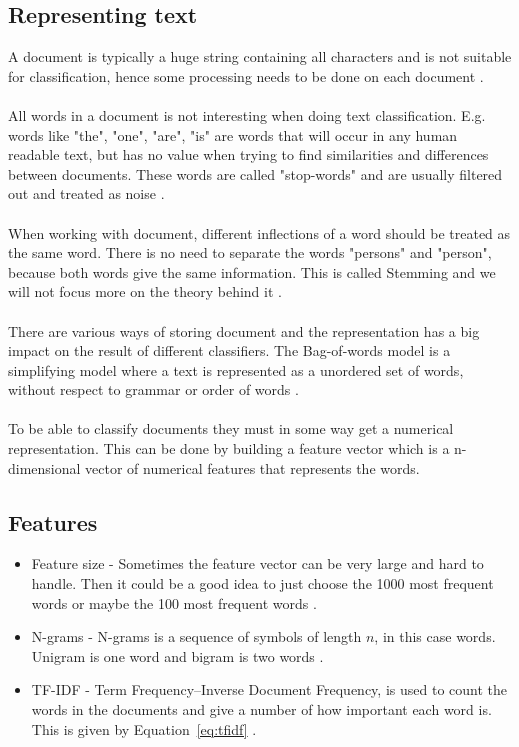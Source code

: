 \subsection{Representing text}
A document is typically a huge string containing all characters and is not
suitable for classification, hence some processing needs to be done on each
document \cite{ngrams_ai}.
\\\\
All words in a document is not interesting when doing text classification. E.g.
words like "the", "one", "are", "is" are words that will occur in any human
readable text, but has no value when trying to find similarities and
differences between documents. These words are called "stop-words" and are
usually filtered out and treated as noise \cite{joachims}.
\\\\
When working with document, different inflections of a word should be treated
as the same word. There is no need to separate the words "persons" and
"person", because both words give the same information. This is called Stemming
and we will not focus more on the theory behind it \cite{stemming}.
\\\\
There are various ways of storing document and the representation has a big
impact on the result of different classifiers. The Bag-of-words model is a
simplifying model where a text is represented as a unordered set of words,
without respect to grammar or order of words \citep{bag_of_words}.
\\\\
To be able to classify documents they must in some way get a numerical representation. 
This can be done by building a feature vector which is a n-dimensional vector of numerical 
features that represents the words.
\subsection{Features}
\begin{itemize}
\item Feature size - Sometimes the feature vector can be very large and hard to
        handle. Then it could be a good idea to just choose the 1000 most
        frequent words or maybe the 100 most frequent words \citep{joachims}.
\item N-grams - N-grams is a sequence of symbols of length $n$, in this case
        words. Unigram is one word and bigram is two words \citep{ngrams_ai}.
\item TF-IDF - Term Frequency–Inverse Document Frequency, is used to count the
        words in the documents and give a number of how important each word is.
        This is given by Equation~\ref{eq:tfidf} \citep{tfidf}.
\end{itemize}

